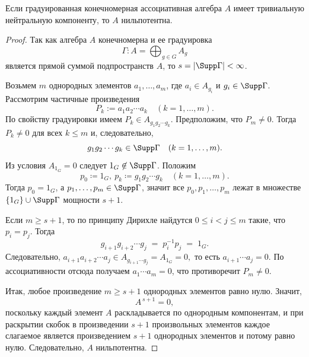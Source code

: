 \begin{lemma}\label{l:graded-trivial-zero-nilpotent}
    Если градуированная конечномерная ассоциативная алгебра $A$ имеет тривиальную
    нейтральную компоненту, то $A$ нильпотентна.
\end{lemma}
\begin{proof}
    Так как алгебра $A$ конечномерна и ее градуировка
    \[
        \Gamma \colon A = \bigoplus_{g \in G}A_g
    \]
    является прямой суммой подпространств $A$, то $s = \left|\Supp \Gamma\right| <
        \infty$.

    Возьмем $m$ однородных элементов $a_1,\dots,a_m$, где $a_i\in A_{g_i}$ и
    $g_i\in \Supp \Gamma$. Рассмотрим частичные произведения
    \[
        P_k:=a_1a_2\cdots a_k \quad (k=1,\dots,m).
    \]
    По свойству градуировки имеем $P_k\in A_{g_1g_2\cdots g_k}$. Предположим, что
    $P_m\neq 0$. Тогда $P_k\neq 0$ для всех $k\le m$ и, следовательно,
    \[
        g_1g_2\cdots g_k \in \Supp \Gamma\quad (k=1,\dots,m).
    \]
    Из условия $A_{1_G} = 0$ следует $1_G \not\in \Supp \Gamma$. Положим
    \[
        p_0\coloneq 1_G,\
        p_k\coloneq g_1g_2\cdots g_k \quad (k=1,\dots,m).
    \]
    Тогда $p_0=1_G$, а $p_1,\dots,p_m\in \Supp \Gamma$, значит все
    $p_0,p_1,\dots,p_m$ лежат в множестве $\{1_G\}\cup \Supp \Gamma$ мощности $s +
        1$.

    Если $m \geq s + 1$, то по принципу Дирихле найдутся $0\le i<j\le m$ такие, что
    $p_i=p_j$. Тогда
    \[
        g_{i+1}g_{i+2}\cdots g_j \;=\; p_i^{-1}p_j \;=\; 1_G.
    \]
    Следовательно, $ a_{i+1}a_{i+2}\cdots a_j \in A_{g_{i+1}\cdots g_j}=A_{1_G}=0,
    $ то есть $a_{i+1}\cdots a_j=0$. По ассоциативности отсюда получаем $a_1\cdots
        a_m=0$, что противоречит $P_m\neq 0$.

    \medskip

    Итак, любое произведение $m\ge s+1$ однородных элементов равно нулю. Значит,
    \[
        A^{\,s+1}=0,
    \]
    поскольку каждый элемент $A$ раскладывается по однородным компонентам, и при
    раскрытии скобок в произведении $s+1$ произвольных элементов каждое слагаемое
    является произведением $s+1$ однородных элементов и потому равно нулю.
    Следовательно, $A$ нильпотентна.
\end{proof}
